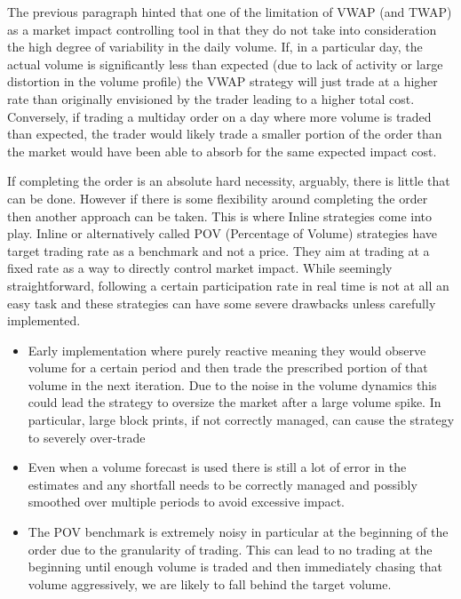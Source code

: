 The previous paragraph hinted that one of the limitation of VWAP (and TWAP) as a market impact controlling tool in that they do not take into consideration the high degree of variability in the daily volume. If, in a particular day, the actual volume is significantly less than expected (due to lack of activity or large distortion in the volume profile) the VWAP strategy will just trade at a higher rate than originally envisioned by the trader leading to a higher total cost. Conversely, if trading a multiday order on a day where more volume is traded than expected, the trader would likely trade a smaller portion of the order than the market would have been able to absorb for the same expected impact cost.


If completing the order is an absolute hard necessity, arguably, there is little that can be done. However if there is some flexibility around completing the order then another approach can be taken. This is where Inline strategies come into play. Inline or alternatively called POV (Percentage of Volume) strategies have target trading rate as a benchmark and not a price. They aim at trading at a fixed rate as a way to directly control market impact. While seemingly straightforward, following a certain participation rate in real time is not at all an easy task and these strategies can have some severe drawbacks unless carefully implemented.


\begin{itemize}
\item Early implementation where purely reactive meaning they would observe volume for a certain period and then trade the prescribed portion of that volume in the next iteration. Due to the noise in the volume dynamics this could lead the strategy to oversize the market after a large volume spike. In particular, large block prints, if not correctly managed, can cause the strategy to severely over-trade

\item Even when a volume forecast is used there is still a lot of error in the estimates and any shortfall needs to be correctly managed and possibly smoothed over multiple periods to avoid excessive impact.

\item The POV benchmark is extremely noisy in particular at the beginning of the order due to the granularity of trading. This can lead to no trading at the beginning until enough volume is traded and then immediately chasing that volume aggressively, we are likely to fall behind the target volume.
\end{itemize}



